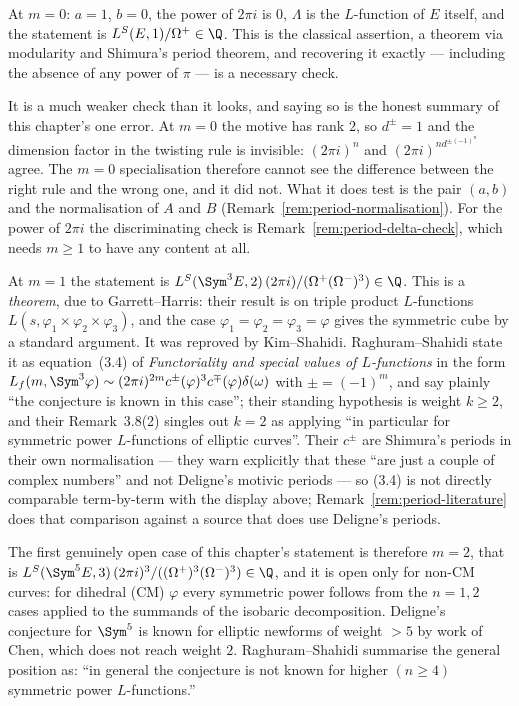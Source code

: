 \begin{remark}[Specialisation to $m=0$]
  \label{rem:sympow-m0}
  At $m=0$: $a=1$, $b=0$, the power of $2\pi i$ is $0$, $\Lambda$ is the $L$-function of $E$
  itself, and the statement is $L^{S}(E,1)/\Omega^{+} \in \Q$. This is the classical
  assertion, a theorem via modularity and Shimura's period theorem, and recovering it exactly
  --- including the absence of any power of $\pi$ --- is a necessary check.

  It is a much weaker check than it looks, and saying so is the honest summary of this
  chapter's one error. At $m=0$ the motive has rank $2$, so $d^{\pm}=1$ and the dimension
  factor in the twisting rule is invisible: $(2\pi i)^{n}$ and $(2\pi i)^{n d^{\pm(-1)^{n}}}$
  agree.
  The $m=0$ specialisation therefore cannot see the difference between the right rule and the
  wrong one, and it did not. What it does test is the pair $(a,b)$ and the normalisation of
  $A$ and $B$ (Remark~\ref{rem:period-normalisation}). For the power of $2\pi i$ the
  discriminating check is Remark~\ref{rem:period-delta-check}, which needs $m \geq 1$ to have
  any content at all.

  At $m=1$ the statement is
  $L^{S}(\Sym^{3}E,2)\,(2\pi i)/(\Omega^{+}(\Omega^{-})^{3}) \in \Q$. This is a
  \emph{theorem}, due to Garrett--Harris: their result is on triple product $L$-functions
  $L(s,\varphi_{1}\times\varphi_{2}\times\varphi_{3})$, and the case
  $\varphi_{1}=\varphi_{2}=\varphi_{3}=\varphi$ gives the symmetric cube by a standard
  argument. It was reproved by Kim--Shahidi. Raghuram--Shahidi state it as equation~(3.4) of
  \emph{Functoriality and special values of $L$-functions} in the form
  $L_{f}(m,\Sym^{3}\varphi) \sim (2\pi i)^{2m}c^{\pm}(\varphi)^{3}c^{\mp}(\varphi)\delta(\omega)$
  with $\pm = (-1)^{m}$, and say plainly ``the conjecture is known in this case''; their
  standing hypothesis is weight $k \geq 2$, and their Remark~3.8(2) singles out $k=2$ as
  applying ``in particular for symmetric power $L$-functions of elliptic curves''. Their
  $c^{\pm}$ are Shimura's periods in their own normalisation --- they warn explicitly that
  these ``are just a couple of complex numbers'' and not Deligne's motivic periods --- so
  (3.4) is not directly comparable term-by-term with the display above;
  Remark~\ref{rem:period-literature} does that comparison against a source that does use
  Deligne's periods.

  The first genuinely open case of this chapter's statement is therefore $m=2$, that is
  $L^{S}(\Sym^{5}E,3)\,(2\pi i)^{3}/((\Omega^{+})^{3}(\Omega^{-})^{3}) \in \Q$, and it is open
  only for non-CM curves: for dihedral (CM) $\varphi$ every symmetric power follows from the
  $n=1,2$ cases applied to the summands of the isobaric decomposition. Deligne's conjecture
  for $\Sym^{5}$ is known for elliptic newforms of weight $>5$ by work of Chen, which does not
  reach weight $2$. Raghuram--Shahidi summarise the general position as: ``in general the
  conjecture is not known for higher $(n \geq 4)$ symmetric power $L$-functions.''
\end{remark}

